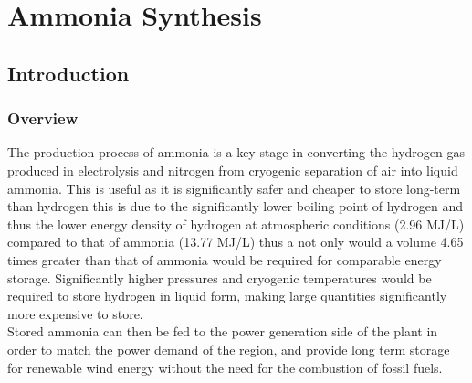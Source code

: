 






\newcommand\tc{400}
\newcommand\pbar{150}
\newcommand\ammOUT{227.6}  %
\newcommand\conv{28}	%
\newcommand\purge{5}



%


\section{Ammonia Synthesis}
\subsection{Introduction}


\subsubsection{Overview}
The production process of ammonia is a key stage in converting the hydrogen gas produced in electrolysis and nitrogen from cryogenic separation of air into liquid ammonia. This is useful as it is significantly safer and cheaper to store long-term than hydrogen this is due to the significantly lower boiling point of hydrogen and thus the lower energy density of hydrogen at atmospheric conditions (2.96 MJ/L) compared to that of ammonia (13.77 MJ/L)\cite{Bartels2008} thus a not only would a volume 4.65 times greater than that of ammonia would be required for comparable energy storage. Significantly higher pressures and cryogenic temperatures would be required to store hydrogen in liquid form, making large quantities significantly more expensive to store.
\\
Stored ammonia can then be fed to the power generation side of the plant in order to match  the power demand of the region, and provide long term storage for renewable wind energy without the need for the combustion of fossil fuels.

